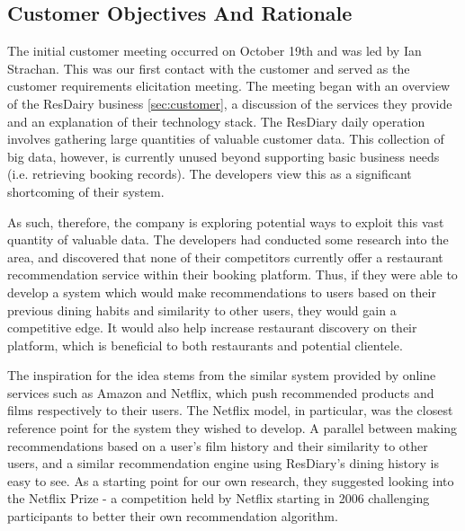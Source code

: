 \documentclass{l3proj}
\begin{document}
\subsection{Customer Objectives And Rationale}
\label{sec:custobjectives}



The initial customer meeting occurred on October 19th and was led by Ian Strachan. This was our first contact with the customer and served as the customer requirements elicitation meeting. The meeting began with an overview of the ResDairy business \ref{sec:customer}, a discussion of the services they provide and an explanation of their technology stack. The ResDiary daily operation involves gathering large quantities of valuable customer data. This collection of big data, however, is currently unused beyond supporting basic business needs (i.e. retrieving booking records). The developers view this as a significant shortcoming of their system.

As such, therefore, the company is exploring potential ways to exploit this vast quantity of valuable data. The developers had conducted some research into the area, and discovered that none of their competitors currently offer a restaurant recommendation service within their booking platform. Thus, if they were able to develop a system which would make recommendations to users based on their previous dining habits and similarity to other users, they would gain a competitive edge. It would also help increase restaurant discovery on their platform, which is beneficial to both restaurants and potential clientele. 

The inspiration for the idea stems from the similar system provided by online services such as Amazon and Netflix, which push recommended products and films respectively to their users. The Netflix model, in particular, was the closest reference point for the system they wished to develop. A parallel between making recommendations based on a user's film history and their similarity to other users, and a similar recommendation engine using ResDiary's dining history is easy to see. As a starting point for our own research, they suggested looking into the Netflix Prize - a competition held by Netflix starting in 2006 challenging participants to better their own recommendation algorithm. 
\end{document}
